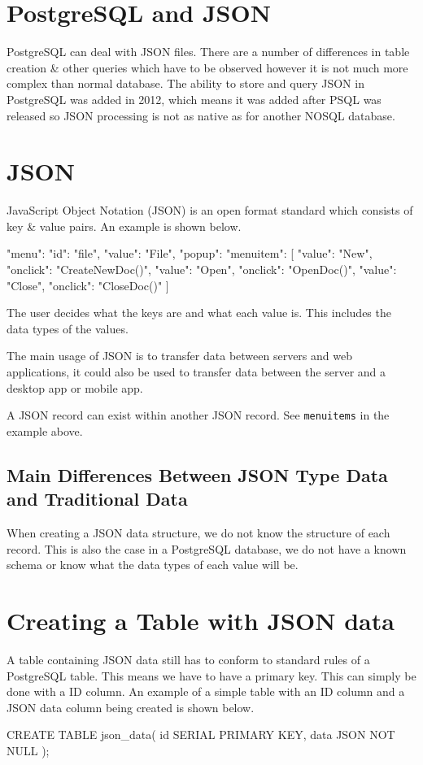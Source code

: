 
\section*{PostgreSQL and JSON}
PostgreSQL can deal with JSON files. There are a number of differences in table creation \& other queries which have to be observed however it is not much more complex than normal database. The ability to store and query JSON in PostgreSQL was added in 2012, which means it was added after PSQL was released so JSON processing is not as native as for another NOSQL database.

\section*{JSON}
JavaScript Object Notation (JSON) is an open format standard which consists of key \& value pairs. An example is shown below.
\begin{pseudo}
{"menu": {
  "id": "file",
  "value": "File",
  "popup": {
    "menuitem": [
      {"value": "New", "onclick": "CreateNewDoc()"},
      {"value": "Open", "onclick": "OpenDoc()"},
      {"value": "Close", "onclick": "CloseDoc()"}
    ]
  }
}}
\end{pseudo}

The user decides what the keys are and what each value is. This includes the data types of the values.

The main usage of JSON is to transfer data between servers and web applications, it could also be used to transfer data between the server and a desktop app or mobile app. 

A JSON record can exist within another JSON record. See \verb|menuitems| in the example above. 

\subsection*{Main Differences Between JSON Type Data and Traditional Data}
When creating a JSON data structure, we do not know the structure of each record. This is also the case in a PostgreSQL database, we do not have a known schema or know what the data types of each value will be. 

\section*{Creating a Table with JSON data}
A table containing JSON data still has to conform to standard rules of a PostgreSQL table. This means we have to have a primary key. This can simply be done with a ID column. An example of a simple table with an ID column and a JSON data column being created is shown below.
\begin{sql}
CREATE TABLE json_data(
    id SERIAL PRIMARY KEY,
    data JSON NOT NULL
);
\end{sql}

